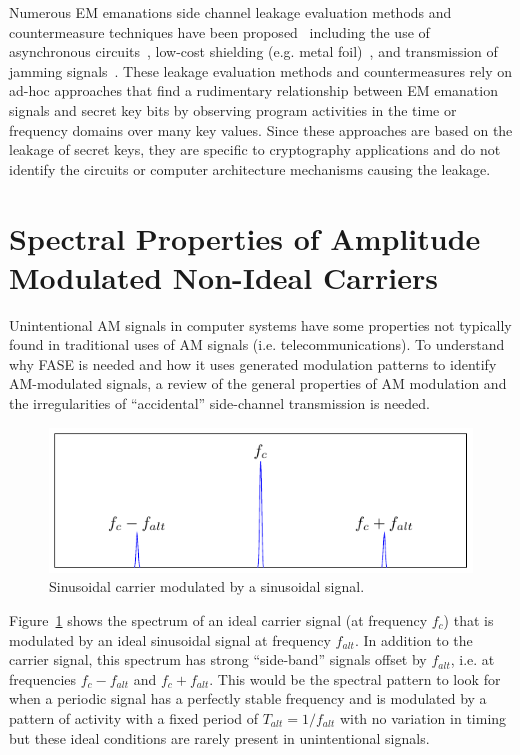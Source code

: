Numerous EM emanations side channel leakage evaluation methods and countermeasure techniques have been proposed~\cite{Olivier01,seto09,Suzuki10,Sekiguchi12,Khun13,Samyde01,Tanaka08,hayashi_2013,Seto13,Hayashi13a} including the use of asynchronous circuits~\cite{Taylor03}, low-cost shielding (e.g. metal foil)~\cite{Plos08}, and transmission of jamming signals~\cite{Poucheret10}. %
These leakage evaluation methods and countermeasures rely on ad-hoc approaches that find a rudimentary relationship between EM emanation signals and secret key bits by observing program activities in the time or frequency domains over many key values. Since these approaches are based on the leakage of secret keys, they are specific to cryptography applications and do not identify the circuits or computer architecture mechanisms causing the leakage.

\section{Spectral Properties of Amplitude Modulated Non-Ideal Carriers}
\label{am_spectra}
Unintentional AM signals in computer systems have some properties not typically found in traditional uses of AM signals (i.e. telecommunications). To understand why FASE is needed and how it uses generated modulation patterns to identify AM-modulated signals, a review of the general properties of AM modulation and the irregularities of ``accidental'' side-channel transmission is needed. 

\begin{figure}[htb]
  \centering
    \includegraphics[scale=.95]{../fase/Data/am_details_a.pdf}
  \caption{Sinusoidal carrier modulated by a sinusoidal signal.}
  \label{am_details_a}
\end{figure}

Figure~\ref{am_details_a} shows the spectrum of an ideal carrier signal (at frequency $f_c$) that is modulated by an ideal sinusoidal signal at frequency $f_{alt}$. In addition to the carrier signal, this spectrum has strong ``side-band'' signals offset by $f_{alt}$, i.e. at frequencies $f_c - f_{alt}$ and $f_c + f_{alt}$. This would be the spectral pattern to look for when a periodic signal has a perfectly stable frequency and is modulated by a pattern of activity with a fixed period of $T_{alt} = 1/f_{alt}$ with no variation in timing but these ideal conditions are rarely present in unintentional signals.

